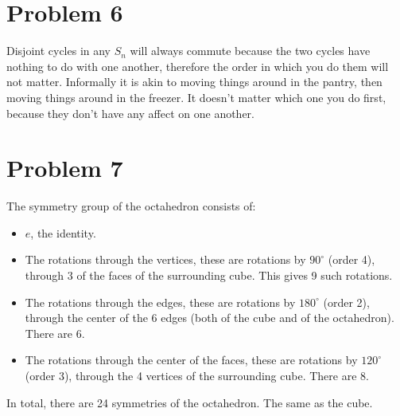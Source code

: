 \documentclass[a4paper,12pt]{extarticle}
\theoremstyle{definition}
\begin{document}
\section*{Problem 6}Disjoint cycles in any $S_n$ will always commute because the two cycles have nothing to do with one another, therefore the order in which you do them will not matter. Informally it is akin to moving things around in the pantry, then moving things around in the freezer. It doesn't matter which one you do first, because they don't have any affect on one another.
\section*{Problem 7} The symmetry group of the octahedron consists of:\begin{itemize}
    \item $e$, the identity.
    \item The rotations through the vertices, these are rotations by $90^{\circ}$ (order 4), through 3 of the faces of the surrounding cube. This gives 9 such rotations.
    \item The rotations through the edges, these are rotations by $180^{\circ}$ (order 2), through the center of the 6 edges (both of the cube and of the octahedron). There are 6.
    \item The rotations through the center of the faces, these are rotations by $120^{\circ}$ (order 3), through the 4 vertices of the surrounding cube. There are 8.
\end{itemize}In total, there are 24 symmetries of the octahedron. The same as the cube.
\end{document}
